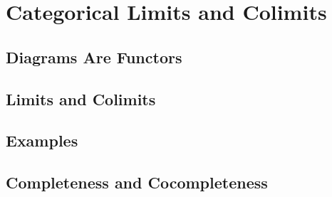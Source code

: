 \chapter{Categorical Limits and Colimits}

\section{Diagrams Are Functors}



\section{Limits and Colimits}



\section{Examples}










\section{Completeness and Cocompleteness}


